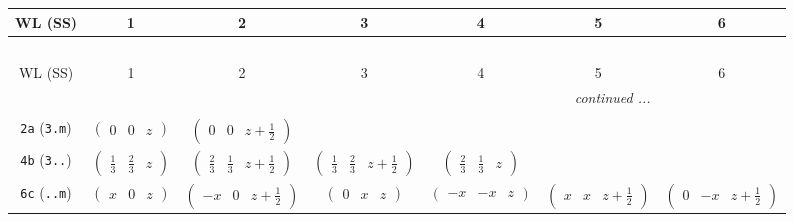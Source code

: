 \documentclass[fleqn,9pt,landscape]{jsarticle}
\begin{document}
\begin{center}
\renewcommand{\arraystretch}{1.2}
\begin{longtable}{ccccccc}
 \hline \hline
WL (SS) & 1 & 2 & 3 & 4 & 5 & 6 \\ \hline \endfirsthead

\multicolumn{6}{l}{\tablename\ \thetable{}} \\
 \hline \hline
WL (SS) & 1 & 2 & 3 & 4 & 5 & 6 \\ \hline \endhead

 \hline \hline
\multicolumn{6}{r}{\footnotesize\it continued ...} \\ \endfoot

 \hline \hline
\multicolumn{6}{r}{} \\ \endlastfoot

{\tt 2a} ({\tt 3.m}) & $ \begin{pmatrix} 0 & 0 & z \end{pmatrix} $ & $ \begin{pmatrix} 0 & 0 & z + \frac{1}{2} \end{pmatrix} $ & $  $ & $  $ & $  $ & $  $ \\ \hline
{\tt 4b} ({\tt 3..}) & $ \begin{pmatrix} \frac{1}{3} & \frac{2}{3} & z \end{pmatrix} $ & $ \begin{pmatrix} \frac{2}{3} & \frac{1}{3} & z + \frac{1}{2} \end{pmatrix} $ & $ \begin{pmatrix} \frac{1}{3} & \frac{2}{3} & z + \frac{1}{2} \end{pmatrix} $ & $ \begin{pmatrix} \frac{2}{3} & \frac{1}{3} & z \end{pmatrix} $ & $  $ & $  $ \\ \hline
{\tt 6c} ({\tt ..m}) & $ \begin{pmatrix} x & 0 & z \end{pmatrix} $ & $ \begin{pmatrix} - x & 0 & z + \frac{1}{2} \end{pmatrix} $ & $ \begin{pmatrix} 0 & x & z \end{pmatrix} $ & $ \begin{pmatrix} - x & - x & z \end{pmatrix} $ & $ \begin{pmatrix} x & x & z + \frac{1}{2} \end{pmatrix} $ & $ \begin{pmatrix} 0 & - x & z + \frac{1}{2} \end{pmatrix} $ \\ \hline

\end{longtable}
\end{center}
\end{document}
